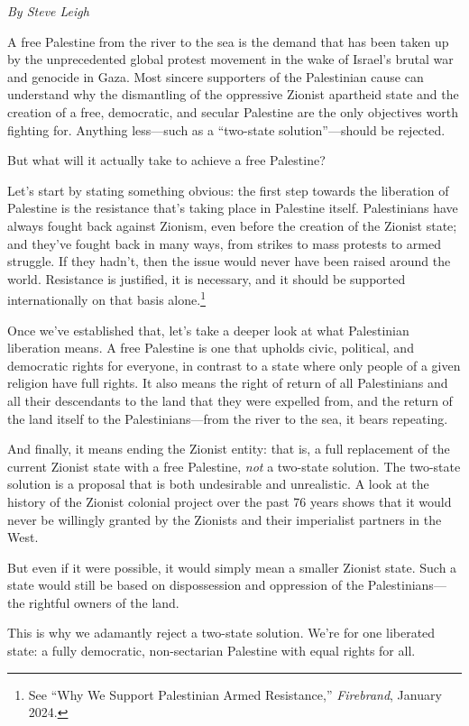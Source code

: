 \emph{By Steve Leigh}

A free Palestine from the river to the sea is the demand that has been taken up by the unprecedented global protest movement in the wake of Israel's brutal war and genocide in Gaza. Most sincere supporters of the Palestinian cause can understand why the dismantling of the oppressive Zionist apartheid state and the creation of a free, democratic, and secular Palestine are the only objectives worth fighting for. Anything less---such as a ``two-state solution''---should be rejected.

But what will it actually take to achieve a free Palestine?

Let's start by stating something obvious: the first step towards the liberation of Palestine is the resistance that's taking place in Palestine itself. Palestinians have always fought back against Zionism, even before the creation of the Zionist state; and they've fought back in many ways, from strikes to mass protests to armed struggle. If they hadn't, then the issue would never have been raised around the world. Resistance is justified, it is necessary, and it should be supported internationally on that basis alone.\footnote{See ``Why We Support Palestinian Armed Resistance,'' \emph{Firebrand}, January 2024.}

Once we've established that, let's take a deeper look at what Palestinian liberation means. A free Palestine is one that upholds civic, political, and democratic rights for everyone, in contrast to a state where only people of a given religion have full rights. It also means the right of return of all Palestinians and all their descendants to the land that they were expelled from, and the return of the land itself to the Palestinians---from the river to the sea, it bears repeating.

And finally, it means ending the Zionist entity: that is, a full replacement of the current Zionist state with a free Palestine, \emph{not} a two-state solution. The two-state solution is a proposal that is both undesirable and unrealistic. A look at the history of the Zionist colonial project over the past 76 years shows that it would never be willingly granted by the Zionists and their imperialist partners in the West.

But even if it were possible, it would simply mean a smaller Zionist state. Such a state would still be based on dispossession and oppression of the Palestinians---the rightful owners of the land.

This is why we adamantly reject a two-state solution. We're for one liberated state: a fully democratic, non-sectarian Palestine with equal rights for all.

